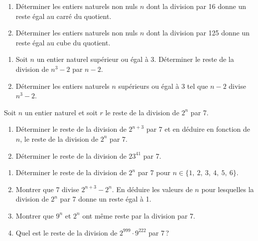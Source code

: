 %
\begin{exo}
      \begin{enumerate}
            \item D\'eterminer les entiers naturels non nuls $n$ dont 
                  la division par 16 donne un reste \'egal au carr\'e du quotient.
            \item D\'eterminer les entiers naturels non nuls $n$ dont
                  la division par 125 donne un reste \'egal au cube du quotient.
      \end{enumerate}
\end{exo}
%
\begin{exo}
      \begin{enumerate}
            \item Soit $n$ un entier naturel sup\'erieur ou \'egal \`a 3. 
                  D\'eterminer le reste de la division de $n^3 - 2 $ par $n-2$.
            \item D\'eterminer les entiers naturels $n$ sup\'erieurs ou \'egal \`a 3 tel que $n -2 $ divise $n^3 - 2$.
      \end{enumerate}
\end{exo}
%
\begin{exo}
      Soit $n$ un entier naturel et soit $r$ le reste de la division de $2^n $ par 7.
      \begin{enumerate}
            \item D\'eterminer le reste de la division de $2^{n+3}$ par 7 et en d\'eduire en fonction de $n$, 
                  le reste de la division de $2^n$ par 7.
            \item D\'eterminer le reste de la division de $23^{41}$ par 7.
      \end{enumerate}
\end{exo}
%
\begin{exo}
      \begin{enumerate}
            \item D\'eterminer le reste de la division de $2^n$ par 7 pour $n \in \{ 1, \ 2, \ 3, \ 4, \ 5, \ 6 \}$.
            \item Montrer que 7 divise $2^{n+3} - 2^n$. 
                  En d\'eduire les valeurs de $n$ pour lesquelles la division de $2^n$ par 7 donne un reste \'egal \`a 1.
            \item Montrer que $9^n$ et $2^n$ ont m\^eme reste par la division par 7.
            \item Quel est le reste de la division de $2^{999} \cdot 9^{222}$ par 7\,?
      \end{enumerate}
\end{exo}
